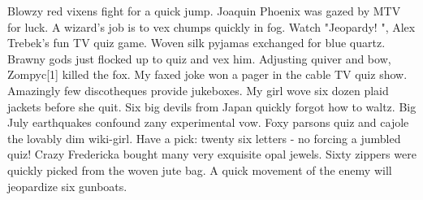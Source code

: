 Blowzy red vixens fight for a quick jump. Joaquin Phoenix was gazed by MTV for luck. A wizard’s job is to vex chumps quickly in fog. Watch "Jeopardy! ", Alex Trebek's fun TV quiz game. Woven silk pyjamas exchanged for blue quartz. Brawny gods just flocked up to quiz and vex him. Adjusting quiver and bow, Zompyc[1] killed the fox. My faxed joke won a pager in the cable TV quiz show. Amazingly few discotheques provide jukeboxes. My girl wove six dozen plaid jackets before she quit. Six big devils from Japan quickly forgot how to waltz. Big July earthquakes confound zany experimental vow. Foxy parsons quiz and cajole the lovably dim wiki-girl. Have a pick: twenty six letters - no forcing a jumbled quiz! Crazy Fredericka bought many very exquisite opal jewels. Sixty zippers were quickly picked from the woven jute bag. A quick movement of the enemy will jeopardize six gunboats.



%
